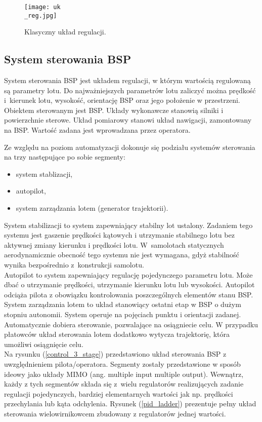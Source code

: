\begin{figure}[!h]
   	\centering
      	\texttt{[image: uk\\\_reg.jpg]}
      	\caption{Klasyczny układ regulacji.}
      	\label{reg}
\end{figure}

\subsection{System sterowania BSP}
System sterowania BSP jest układem regulacji, w którym wartością regulowaną są parametry lotu. Do najważniejszych parametrów lotu zaliczyć można prędkość i~kierunek lotu, wysokość, orientację BSP oraz jego położenie w przestrzeni. Obiektem sterowanym jest BSP. Układy wykonawcze stanowią silniki i powierzchnie sterowe. Układ pomiarowy stanowi układ nawigacji, zamontowany na BSP. Wartość zadana jest wprowadzana przez operatora.

 Ze względu na poziom automatyzacji dokonuje się podziału systemów sterowania na trzy następujące po sobie segmenty:
\begin{itemize}[noitemsep,nolistsep]
\item system stablizacji,
\item autopilot,
\item system zarządzania lotem (generator trajektorii).
\end{itemize}
System stabilizacji to system zapewniający stabilny lot ustalony. Zadaniem tego systemu jest gaszenie prędkości kątowych i utrzymanie stabilnego lotu bez aktywnej zmiany kierunku i prędkości lotu. W~samolotach statycznych aerodynamicznie obecność tego systemu nie jest wymagana, gdyż stabilność wynika bezpośrednio z~konstrukcji samolotu.\\

Autopilot to system zapewniający regulację pojedynczego parametru lotu. Może dbać o utrzymanie prędkości, utrzymanie kierunku lotu lub wysokości. Autopilot odciąża pilota z obowiązku kontrolowania poszczególnych elementów stanu BSP.\\

System zarządzania lotem to układ stanowiący ostatni etap w BSP o dużym stopniu autonomii. System operuje na pojęciach punktu i orientacji zadanej. Automatycznie dobiera sterowanie, pozwalające na osiągniecie celu. W przypadku płatowców układ sterowania lotem dodatkowo wytycza trajektorię, która umożliwi osiągnięcie celu.\\

Na rysunku (\ref{control_3_stage}) przedstawiono układ sterowania BSP z uwzględnieniem pilota/operatora. Segmenty zostały przedstawione w sposób ideowy jako układy MIMO (ang. multiple input multiple output). Wewnątrz, każdy z tych segmentów składa się z~wielu regulatorów realizujących zadanie regulacji pojedynczych, bardziej elementarnych wartości jak np. prędkości przechylania lub kąta odchylenia. Rysunek (\ref{pid_ladder}) prezentuje pełny układ sterowania wielowirnikowcem zbudowany z regulatorów jednej wartości.\\


